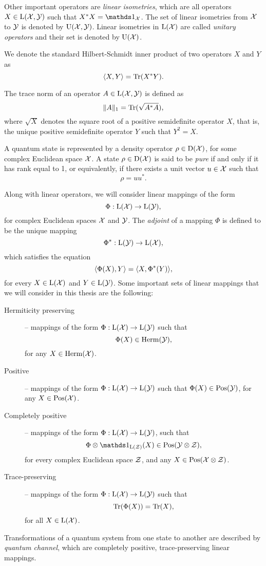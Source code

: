 Other important operators are \emph{linear isometries}, which are all operators
$X\in\mathrm{L}(\mathcal{X},\mathcal{Y})$ such that $X^{\ast}X=\I_{\X}$. The set of linear isometries 
from $\mathcal{X}$ to $\mathcal{Y}$ is denoted by $\mathrm{U}(\mathcal{X},\mathcal{Y})$.
Linear isometries in $\mathrm{L}(\mathcal{X})$ are called \emph{unitary operators} and their 
set is denoted by $\mathrm{U}(\mathcal{X})$.

We denote the standard Hilbert-Schmidt inner product of two operators
$X$ and $Y$ as
\begin{equation}
  \langle X , Y\rangle = \operatorname{Tr}(X^{\ast}Y).
\end{equation}

The trace norm of an operator $A\in\mathrm{L}(\mathcal{X},\mathcal{Y})$ is defined as
\begin{equation}
  \lVert A\rVert_{1} = \operatorname{Tr}(\sqrt{A^{\ast}A}),
\end{equation}
where $\sqrt{X}$ denotes the square root of a positive semidefinite
operator $X$, that is, the unique positive semidefinite operator $Y$ such that $Y^{2} = X$.

A quantum state is represented by a density operator $\rho\in\mathrm{D}(\mathcal{X})$, 
for some complex Euclidean space $\mathcal{X}$. A state $\rho\in\mathrm{D}(\mathcal{X})$ is said 
to be \emph{pure} if and only if it has rank equal to 1, or equivalently, 
if there exists a unit vector $u\in\mathcal{X}$ such that
\[
  \rho = uu^{\ast}.
\]

Along with linear operators, we will consider linear mappings of the form
\[
  \Phi:\mathrm{L}(\mathcal{X}) \rightarrow \mathrm{L}(\mathcal{Y}),
\]
for complex Euclidean spaces $\mathcal{X}$ and $\mathcal{Y}$.
The \emph{adjoint} of a mapping $\Phi$ is defined to be the unique mapping 
\[
  \Phi^{\ast}:\mathrm{L}(\mathcal{Y}) \rightarrow \mathrm{L}(\mathcal{X}),
\]
which satisfies the equation
\begin{equation}
\label{eq:adjoint-map}
  \langle \Phi(X) , Y\rangle = \langle X , \Phi^{\ast}(Y)\rangle,
\end{equation}
for every $X\in\mathrm{L}(\mathcal{X})$ and $Y\in\mathrm{L}(\mathcal{Y})$.
Some important sets of linear mappings that we will consider in this thesis are
the following:
\begin{description}
\item[Hermiticity preserving] -- mappings of the form 
  $\Phi:\mathrm{L}(\mathcal{X})\to\mathrm{L}(\mathcal{Y})$ such that \[\Phi(X) \in \mathrm{Herm}(\mathcal{Y}),\] for any $X\in\mathrm{Herm}(\mathcal{X})$.
\item[Positive] -- mappings of the form 
  $\Phi:\mathrm{L}(\mathcal{X})\to\mathrm{L}(\mathcal{Y})$ such that $\Phi(X) \in \mathrm{Pos}(\mathcal{Y})$, for any $X\in\mathrm{Pos}(\mathcal{X})$.
\item[Completely positive] -- mappings of the form 
  $\Phi:\mathrm{L}(\mathcal{X})\to\mathrm{L}(\mathcal{Y})$, such that 
  \[\Phi\otimes\I_{\Lin(\Z)}(X)\in\Pos(\Y\otimes\Z),\]
  for every complex Euclidean space $\mathcal{Z}$, and any $X\in\mathrm{Pos}(\mathcal{X}\otimes\mathcal{Z})$.
\item[Trace-preserving] -- mappings of the form
  $\Phi:\mathrm{L}(\mathcal{X})\to\mathrm{L}(\mathcal{Y})$ such that 
  \[ \operatorname{Tr}(\Phi(X)) = \operatorname{Tr}(X),\] 
  for all $X\in\mathrm{L}(\mathcal{X})$.
\end{description}
Transformations of a quantum system from one state to another are described by 
\emph{quantum channel}, which are completely positive, trace-preserving linear mappings.

